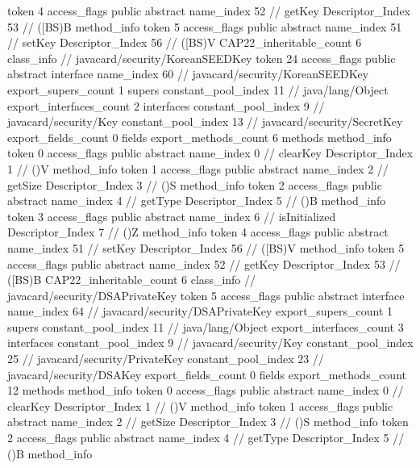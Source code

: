 {{{{{					token	4
					access_flags	public abstract
					name_index	52		// getKey
					Descriptor_Index	53		// ([BS)B
				}
				method_info {
					token	5
					access_flags	public abstract
					name_index	51		// setKey
					Descriptor_Index	56		// ([BS)V
				}
			}
			CAP22_inheritable_count	6
		}
		class_info {		// javacard/security/KoreanSEEDKey
			token	24
			access_flags	public abstract interface
			name_index	60		// javacard/security/KoreanSEEDKey
			export_supers_count	1
			supers {
				constant_pool_index	11		// java/lang/Object
			}
			export_interfaces_count	2
			interfaces {
				constant_pool_index	9		// javacard/security/Key
				constant_pool_index	13		// javacard/security/SecretKey
			}
			export_fields_count	0
			fields {
			}
			export_methods_count	6
			methods {
				method_info {
					token	0
					access_flags	public abstract
					name_index	0		// clearKey
					Descriptor_Index	1		// ()V
				}
				method_info {
					token	1
					access_flags	public abstract
					name_index	2		// getSize
					Descriptor_Index	3		// ()S
				}
				method_info {
					token	2
					access_flags	public abstract
					name_index	4		// getType
					Descriptor_Index	5		// ()B
				}
				method_info {
					token	3
					access_flags	public abstract
					name_index	6		// isInitialized
					Descriptor_Index	7		// ()Z
				}
				method_info {
					token	4
					access_flags	public abstract
					name_index	51		// setKey
					Descriptor_Index	56		// ([BS)V
				}
				method_info {
					token	5
					access_flags	public abstract
					name_index	52		// getKey
					Descriptor_Index	53		// ([BS)B
				}
			}
			CAP22_inheritable_count	6
		}
		class_info {		// javacard/security/DSAPrivateKey
			token	5
			access_flags	public abstract interface
			name_index	64		// javacard/security/DSAPrivateKey
			export_supers_count	1
			supers {
				constant_pool_index	11		// java/lang/Object
			}
			export_interfaces_count	3
			interfaces {
				constant_pool_index	9		// javacard/security/Key
				constant_pool_index	25		// javacard/security/PrivateKey
				constant_pool_index	23		// javacard/security/DSAKey
			}
			export_fields_count	0
			fields {
			}
			export_methods_count	12
			methods {
				method_info {
					token	0
					access_flags	public abstract
					name_index	0		// clearKey
					Descriptor_Index	1		// ()V
				}
				method_info {
					token	1
					access_flags	public abstract
					name_index	2		// getSize
					Descriptor_Index	3		// ()S
				}
				method_info {
					token	2
					access_flags	public abstract
					name_index	4		// getType
					Descriptor_Index	5		// ()B
				}
				method_info {
}}}}}
